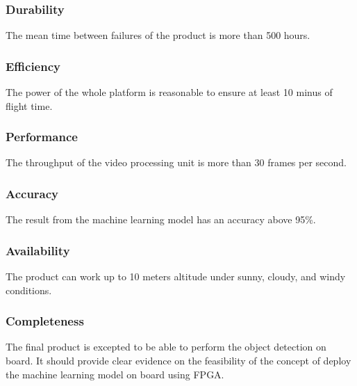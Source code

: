 \subsubsection{Durability}
The mean time between failures of the product is more than 500 hours.

\subsubsection{Efficiency}
The power of the whole platform is reasonable to ensure at least 10 minus of flight time.

\subsubsection{Performance}
The throughput of the video processing unit is more than 30 frames per second.

\subsubsection{Accuracy}
The result from the machine learning model has an accuracy above 95\%.

\subsubsection{Availability}
The product can work up to 10 meters altitude under sunny, cloudy, and windy conditions.

\subsubsection{Completeness}
The final product is excepted to be able to perform the object detection on board. It should provide clear evidence on the feasibility of the concept of deploy the machine learning model on board using FPGA.